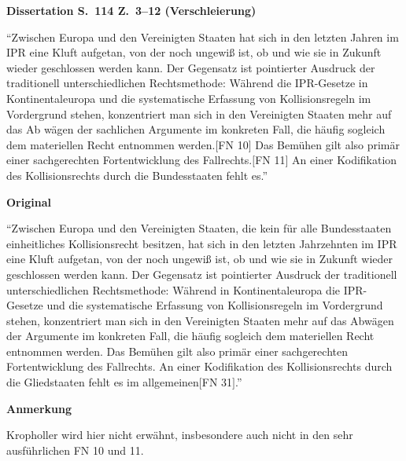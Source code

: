 \documentclass[ngerman,final,fontsize=12pt,paper=a4,twoside,bibliography=totocnumbered,BCOR=8mm,draft=false]{scrartcl}
\newenvironment{fragment}
	{\begin{snugshade}}
	{\end{snugshade}
	 \penalty-200
	 \vskip 0pt plus 10mm minus 5mm}
\newenvironment{fragmentpart}[1]
	{\noindent\textbf{#1}\par\penalty500}
	{\par}
\begin{document}
\begin{fragment}
\begin{fragmentpart}{Dissertation S.~114 Z.~3--12 (Verschleierung)}
\enquote{Zwischen Europa und den Vereinigten Staaten hat sich in den letzten Jahren im IPR eine Kluft aufgetan, von der noch ungewiß ist, ob und wie sie in Zukunft wieder geschlossen werden kann. Der Gegensatz ist pointierter Ausdruck der traditionell unterschiedlichen Rechtsmethode: Während die IPR-Gesetze in Kontinentaleuropa und die systematische Erfassung von Kollisionsregeln im Vordergrund stehen, konzentriert man sich in den Vereinigten Staaten mehr auf das Ab wägen der sachlichen Argumente im konkreten Fall, die häufig sogleich dem materiellen Recht entnommen werden.$[$FN 10$]$ Das Bemühen gilt also primär einer sachgerechten Fortentwicklung des Fallrechts.$[$FN 11$]$ An einer Kodifikation des Kollisionsrechts durch die Bundesstaaten fehlt es.}
\end{fragmentpart}
\begin{fragmentpart}{Original \cite[S.~76 Z.~2--12]{Kropholler-1997}}
\enquote{Zwischen Europa und den Vereinigten Staaten, die kein für alle Bundesstaaten einheitliches Kollisionsrecht besitzen, hat sich in den letzten Jahrzehnten im IPR eine Kluft aufgetan, von der noch ungewiß ist, ob und wie sie in Zukunft wieder geschlossen werden kann. Der Gegensatz ist pointierter Ausdruck der traditionell unterschiedlichen Rechtsmethode: Während in Kontinentaleuropa die IPR-Gesetze und die systematische Erfassung von Kollisionsregeln im Vordergrund stehen, konzentriert man sich in den Vereinigten Staaten mehr auf das Abwägen der Argumente im konkreten Fall, die häufig sogleich dem materiellen Recht entnommen werden. Das Bemühen gilt also primär einer sachgerechten Fortentwicklung des Fallrechts. An einer Kodifikation des Kollisionsrechts durch die Gliedstaaten fehlt es im allgemeinen$[$FN 31$]$.}
\end{fragmentpart}
\begin{fragmentpart}{Anmerkung}
Kropholler wird hier nicht erwähnt, insbesondere auch nicht in den sehr ausführlichen FN 10 und 11.
\end{fragmentpart}
\end{fragment}
\hypertarget{Lm-Fragment-117-11}{}
\end{document}
